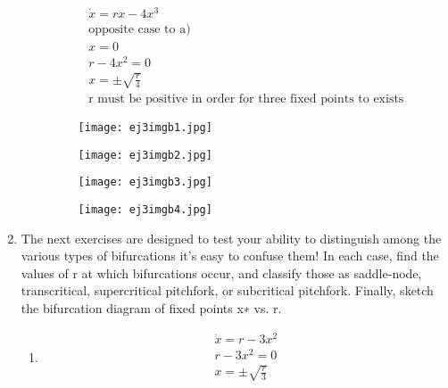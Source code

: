 \documentclass[a4paper,10pt]{article}
\begin{document}
\begin{enumerate}
\begin{enumerate}
\begin{equation}
                    \begin{aligned}
                        \dot{x}= rx- 4x^{3}\\
                        \text{opposite case to a)}\\
                        x=0\\
                        r-4x^{2}=0\\
                        x=\pm\sqrt{\frac{r}{4}}\\
                        \text{r must be positive in order for three fixed points to exists}
                    \end{aligned}
                \end{equation}
                
                \begin{figure}[h]
                    \centering
                    \texttt{[image: ej3imgb1.jpg]}
                    \label{fig:mesh1}
                \end{figure}
                \begin{figure}[h]
                    \centering
                    \texttt{[image: ej3imgb2.jpg]}
                    \label{fig:mesh1}
                \end{figure}
               \newpage
                \begin{figure}[h]
                    \centering
                    \texttt{[image: ej3imgb3.jpg]}
                    \label{fig:mesh1}
                \end{figure}
                \begin{figure}[h]
                    \centering
                    \texttt{[image: ej3imgb4.jpg]}
                    \label{fig:mesh1}
                \end{figure}
        \end{enumerate}
        
    \item The next exercises are designed to test your ability to distinguish among the various types of bifurcations it’s easy to confuse them! In each case, find the values of r at which bifurcations occur, and classify those as saddle-node, transcritical, supercritical pitchfork, or subcritical pitchfork. Finally, sketch the bifurcation diagram of fixed points x∗ vs. r.
        \begin{enumerate}
            \item 
                \begin{equation}
                    \begin{aligned}
                        \dot{x}= r- 3x^{2}\\
                        r- 3x^{2}=0\\
                        x=\pm \sqrt{\frac{r}{3}}\\
    

\end{aligned}
\end{equation}
\end{enumerate}
\end{enumerate}
\end{document}
